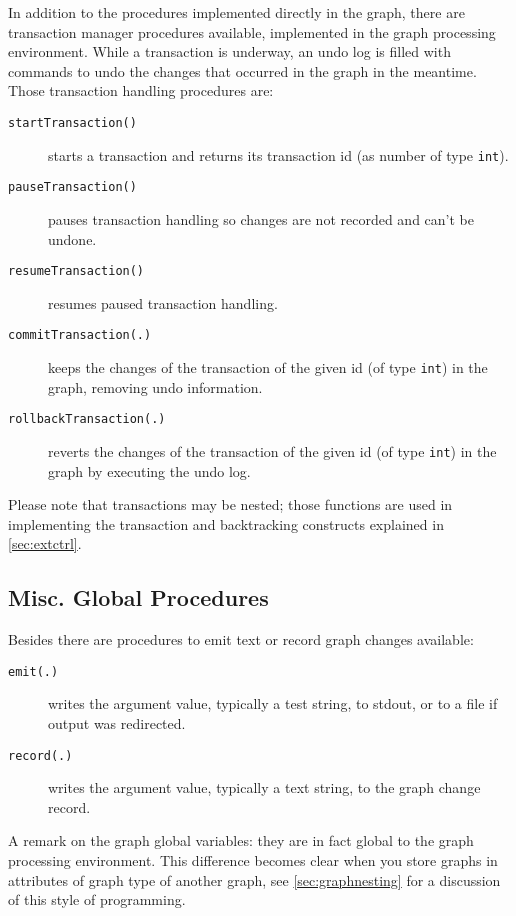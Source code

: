 In addition to the procedures implemented directly in the graph, there are transaction manager procedures available, implemented in the graph processing environment.
While a transaction is underway, an undo log is filled with commands to undo the changes that occurred in the graph in the meantime.
Those transaction handling procedures are:

\begin{description}
\item[\texttt{startTransaction()}] starts a transaction and returns its transaction id (as number of type \texttt{int}).
\item[\texttt{pauseTransaction()}] pauses transaction handling so changes are not recorded and can't be undone.
\item[\texttt{resumeTransaction()}] resumes paused transaction handling.
\item[\texttt{commitTransaction(.)}] keeps the changes of the transaction of the given id (of type \texttt{int}) in the graph, removing undo information.
\item[\texttt{rollbackTransaction(.)}] reverts the changes of the transaction of the given id (of type \texttt{int}) in the graph by executing the undo log.
\end{description}

Please note that transactions may be nested; those functions are used in implementing the transaction and backtracking constructs explained in \ref{sec:extctrl}.


\subsection{Misc. Global Procedures}

Besides there are procedures to emit text or record graph changes available: 

\begin{description}
\item[\texttt{emit(.)}] writes the argument value, typically a test string, to stdout, or to a file if output was redirected. 
\item[\texttt{record(.)}] writes the argument value, typically a text string, to the graph change record.
\end{description}

A remark on the graph global variables: they are in fact global to the graph processing environment.
This difference becomes clear when you store graphs in attributes of graph type of another graph, see \ref{sec:graphnesting} for a discussion of this style of programming.


